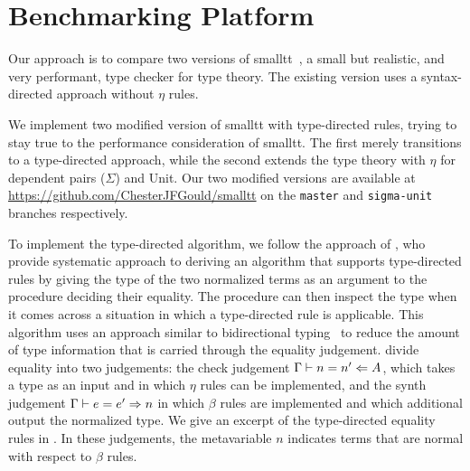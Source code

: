 \section{Benchmarking Platform}
Our approach is to compare two versions of smalltt~\cite{smalltt}, a small but realistic, and very performant, type checker for type theory.
The existing version uses a syntax-directed approach without $\eta$ rules.

We implement two modified version of smalltt with type-directed rules, trying to stay true to the performance consideration of smalltt.
The first merely transitions to a type-directed approach, while the second extends the type theory with $\eta$ for dependent pairs ($\Sigma$) and Unit.
Our two modified versions are available at \url{https://github.com/ChesterJFGould/smalltt} on the \texttt{master} and \texttt{sigma-unit} branches respectively.

To implement the type-directed algorithm, we follow the approach of \citet{Chapman2005}, who provide systematic approach to deriving an algorithm that supports type-directed rules by giving the type of the two normalized terms as an argument to the procedure deciding their equality.
The procedure can then inspect the type when it comes across a situation in which a type-directed rule is applicable.
This algorithm uses an approach similar to bidirectional typing~\cite{Dunfield2021} to reduce the amount of type information that is carried through the equality judgement.
\citet{Chapman2005} divide equality into two judgements: the check judgement $\Gamma \vdash n = n' \Leftarrow A$, which takes a type as an input and in which $\eta$ rules can be implemented, and the synth judgement $\Gamma \vdash e = e' \Rightarrow n$ in which $\beta$ rules are implemented and which additional output the normalized type.
We give an excerpt of the type-directed equality rules in .
In these judgements, the metavariable $n$ indicates terms that are normal with respect to $\beta$ rules.

% 

